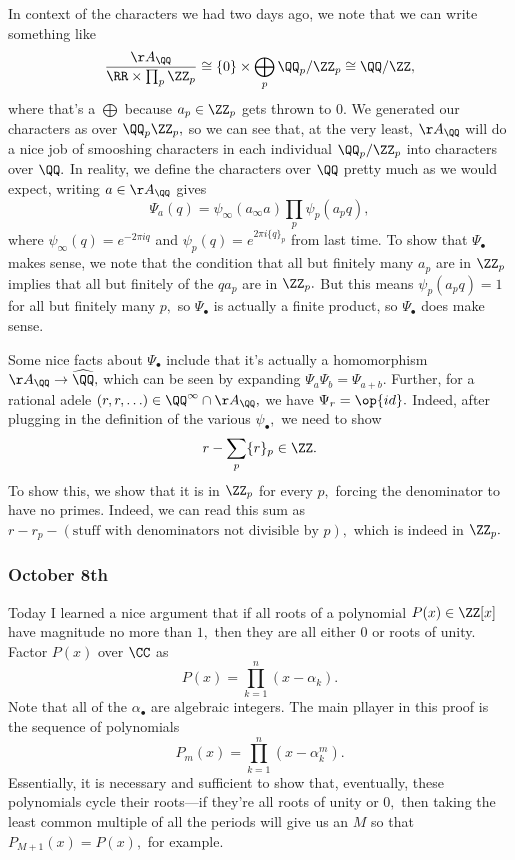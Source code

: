 In context of the characters we had two days ago, we note that we can write something like
\[\frac{\AA_\QQ}{\RR\times\prod_p\ZZ_p}\cong\{0\}\times\bigoplus_p\QQ_p/\ZZ_p\cong\QQ/\ZZ,\]
where that's a $\bigoplus$ because $a_p\in\ZZ_p$ gets thrown to $0.$ We generated our characters as over $\QQ_p\ZZ_p,$ so we can see that, at the very least, $\AA_\QQ$ will do a nice job of smooshing characters in each individual $\QQ_p/\ZZ_p$ into characters over $\QQ.$ In reality, we define the characters over $\QQ$ pretty much as we would expect, writing  $a\in\AA_\QQ$ gives
\[\Psi_a(q)=\psi_\infty(a_\infty a)\prod_p\psi_p(a_pq),\]
where $\psi_\infty(q)=e^{-2\pi iq}$ and $\psi_p(q)=e^{2\pi i\{q\}_p}$ from last time. To show that $\Psi_\bullet$ makes sense, we note that the condition that all but finitely many $a_p$ are in $\ZZ_p$ implies that all but finitely of the $qa_p$ are in $\ZZ_p.$ But this means $\psi_p(a_pq)=1$ for all but finitely many $p,$ so $\Psi_\bullet$ is actually a finite product, so $\Psi_\bullet$ does make sense.

Some nice facts about $\Psi_\bullet$ include that it's actually a homomorphism $\AA_\QQ\to\widehat\QQ,$ which can be seen by expanding $\Psi_a\Psi_b=\Psi_{a+b}.$ Further, for a rational adele $(r,r,\ldots)\in\QQ^\infty\cap\AA_\QQ,$ we have $\Psi_r=\op{id}.$ Indeed, after plugging in the definition of the various $\psi_\bullet,$ we need to show
\[r-\sum_p\{r\}_p\in\ZZ.\]
To show this, we show that it is in $\ZZ_p$ for every $p,$ forcing the denominator to have no primes. Indeed, we can read this sum as $r-r_p-(\text{stuff with denominators not divisible by }p),$ which is indeed in $\ZZ_p.$

\subsubsection{October 8th}
Today I learned a nice argument that if all roots of a polynomial $P(x)\in\ZZ[x]$ have magnitude no more than $1,$ then they are all either $0$ or roots of unity. Factor $P(x)$ over $\CC$ as
\[P(x)=\prod_{k=1}^n(x-\alpha_k).\]
Note that all of the $\alpha_\bullet$ are algebraic integers. The main pllayer in this proof is the sequence of polynomials
\[P_m(x)=\prod_{k=1}^n\left(x-\alpha_k^m\right).\]
Essentially, it is necessary and sufficient to show that, eventually, these polynomials cycle their roots---if they're all roots of unity or $0,$ then taking the least common multiple of all the periods will give us an $M$ so that $P_{M+1}(x)=P(x),$ for example.

